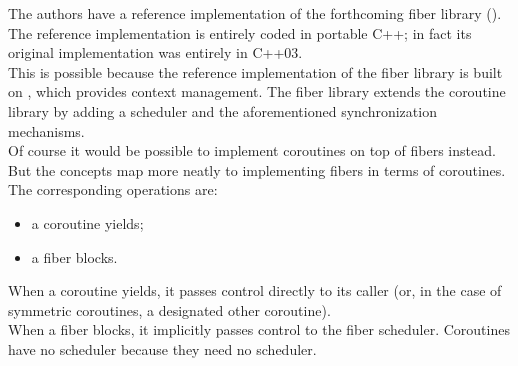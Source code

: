 The authors have a reference implementation of the forthcoming fiber library
(\boostfiber). The reference implementation is entirely
coded in portable C++; in fact its original implementation was entirely in
C++03.\\
\newline
This is possible because the reference implementation of the fiber library is
built on \boostcoroutine, which provides context management. The fiber library
extends the coroutine library by adding a scheduler and the aforementioned
synchronization mechanisms.\\
\newline
Of course it would be possible to implement coroutines on top of fibers
instead. But the concepts map more neatly to implementing fibers in terms of
coroutines. The corresponding operations are:

\begin{itemize}
    \item a coroutine yields;
    \item a fiber blocks.
\end{itemize}

When a coroutine yields, it passes control directly to its caller (or, in the
case of symmetric coroutines, a designated other coroutine).\\
\newline
When a fiber blocks, it implicitly passes control to the fiber scheduler.
Coroutines have no scheduler because they need no scheduler.
